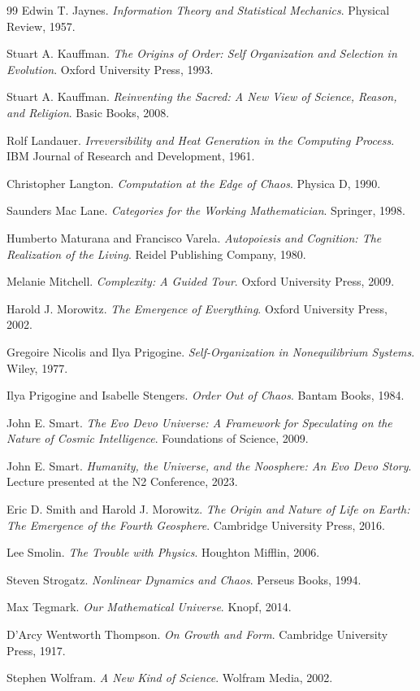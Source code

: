 \documentclass[12pt]{article}
\begin{document}
\begin{thebibliography}{99}
Edwin T. Jaynes.
\textit{Information Theory and Statistical Mechanics}.
Physical Review, 1957.

Stuart A. Kauffman.
\textit{The Origins of Order: Self Organization and Selection in Evolution}.
Oxford University Press, 1993.

Stuart A. Kauffman.
\textit{Reinventing the Sacred: A New View of Science, Reason, and Religion}.
Basic Books, 2008.

Rolf Landauer.
\textit{Irreversibility and Heat Generation in the Computing Process}.
IBM Journal of Research and Development, 1961.

Christopher Langton.
\textit{Computation at the Edge of Chaos}.
Physica D, 1990.

Saunders Mac Lane.
\textit{Categories for the Working Mathematician}.
Springer, 1998.

Humberto Maturana and Francisco Varela.
\textit{Autopoiesis and Cognition: The Realization of the Living}.
Reidel Publishing Company, 1980.

Melanie Mitchell.
\textit{Complexity: A Guided Tour}.
Oxford University Press, 2009.

Harold J. Morowitz.
\textit{The Emergence of Everything}.
Oxford University Press, 2002.

Gregoire Nicolis and Ilya Prigogine.
\textit{Self-Organization in Nonequilibrium Systems}.
Wiley, 1977.

Ilya Prigogine and Isabelle Stengers.
\textit{Order Out of Chaos}.
Bantam Books, 1984.

John E. Smart.
\textit{The Evo Devo Universe: A Framework for Speculating on the Nature of Cosmic Intelligence}.
Foundations of Science, 2009.

John E. Smart.
\textit{Humanity, the Universe, and the Noosphere: An Evo Devo Story}.
Lecture presented at the N2 Conference, 2023.

Eric D. Smith and Harold J. Morowitz.
\textit{The Origin and Nature of Life on Earth: The Emergence of the Fourth Geosphere}.
Cambridge University Press, 2016.

Lee Smolin.
\textit{The Trouble with Physics}.
Houghton Mifflin, 2006.

Steven Strogatz.
\textit{Nonlinear Dynamics and Chaos}.
Perseus Books, 1994.

Max Tegmark.
\textit{Our Mathematical Universe}.
Knopf, 2014.

D'Arcy Wentworth Thompson.
\textit{On Growth and Form}.
Cambridge University Press, 1917.

Stephen Wolfram.
\textit{A New Kind of Science}.
Wolfram Media, 2002.

\end{thebibliography}
\end{document}
